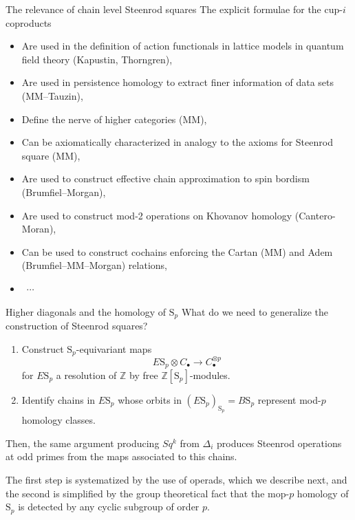 \documentclass[10pt,t]{beamer}
\renewcommand{\S}{\mathrm{S}}
\begin{document}
\begin{frame}{The relevance of chain level Steenrod squares}
	The explicit formulae for the cup-$i$ coproducts	
	\begin{itemize}
		\item Are used in the definition of action functionals in lattice models in quantum field theory (Kapustin, Thorngren), \pause
		\item Are used in persistence homology to extract finer information of data sets (MM--Tauzin), \pause
		\item Define the nerve of higher categories (MM), \pause
		\item Can be axiomatically characterized in analogy to the axioms for Steenrod square (MM), \pause
		\item Are used to construct effective chain approximation to spin bordism (Brumfiel--Morgan), \pause
		\item Are used to construct mod-2 operations on Khovanov homology (Cantero-Moran), \pause
		\item Can be used to construct cochains enforcing the Cartan (MM) and Adem (Brumfiel--MM--Morgan) relations,
		\item \ $\cdots$
	\end{itemize}
\end{frame}


\begin{frame}{Higher diagonals and the homology of $\S_p$}
	What do we need to generalize the construction of Steenrod squares?
	
	\pause \vspace{10pt}
	
	\begin{enumerate}
		\item Construct $\S_p$-equivariant maps
		\begin{equation*}
		E\S_p \otimes C_\bullet \to C_\bullet^{\otimes p}
		\end{equation*}
		for $E\S_p$ a resolution of $\mathbb Z$ by free $\mathbb Z[\S_p]$-modules.
		\vspace*{10pt} \pause
		\item Identify chains in $E\S_p$ whose orbits in $(E\S_p)_{\S_p} = B\S_p$ represent mod-$p$ homology classes.
	\end{enumerate}
	
	\vspace*{10pt}\pause

	Then, the same argument producing $Sq^k$ from $\Delta_i$ produces Steenrod operations at odd primes from the maps associated to this chains.

	\vspace*{10pt}\pause

	The first step is systematized by the use of operads, which we describe next, and the second is simplified by the group theoretical fact that the mop-$p$ homology of $\S_p$ is detected by any cyclic subgroup of order $p$.
\end{frame}
\end{document}
